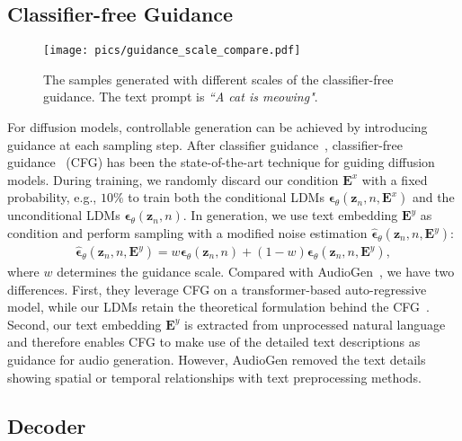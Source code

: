 \subsection{Classifier-free Guidance}
\label{CFG}

\begin{figure}[htbp]
    \centering
    \texttt{[image: pics/guidance\_scale\_compare.pdf]}
    \caption{The samples generated with different scales of the classifier-free guidance. The text prompt is \textit{``A cat is meowing"}.}
    \label{fig:my_label}
\end{figure}

For diffusion models, controllable generation can be achieved by introducing guidance at each sampling step. After classifier guidance~\cite{SGM,ImprovedDDPM}, classifier-free guidance~\cite{CFG,Glide} (CFG) has been the state-of-the-art technique for guiding diffusion models. During training, we randomly discard our condition $\boldsymbol{E}^{x}$ with a fixed probability, e.g., $10\%$ to train both the conditional LDMs $\boldsymbol{\epsilon}_{\theta}(\boldsymbol{z}_{n},n,\boldsymbol{E}^{x})$ and the unconditional LDMs $\boldsymbol{\epsilon}_{\theta}(\boldsymbol{z}_{n},n)$. In generation, we use text embedding $\boldsymbol{E}^{y}$ as condition and perform sampling with a modified noise estimation $\hat{\boldsymbol{\epsilon}}_{\theta}(\boldsymbol{z}_{n},n,\boldsymbol{E}^{y})$:
\begin{align}
\label{mixup}
\hat{\boldsymbol{\epsilon}}_{\theta}(\boldsymbol{z}_{n},n,\boldsymbol{E}^{y}) = w\boldsymbol{\epsilon}_{\theta}(\boldsymbol{z}_{n},n)+(1-w)\boldsymbol{\epsilon}_{\theta}(\boldsymbol{z}_{n},n,\boldsymbol{E}^{y}),
\end{align}
where $w$ determines the guidance scale.
Compared with AudioGen~\cite{kreuk2022audiogen}, we have two differences. First, they leverage CFG on a transformer-based auto-regressive model, while our LDMs retain the theoretical formulation behind the CFG~\cite{CFG}. Second, our text embedding $\boldsymbol{E}^{y}$ is extracted from unprocessed natural language and therefore enables CFG to make use of the detailed text descriptions as guidance for audio generation. However, AudioGen removed the text details showing spatial or temporal relationships with text preprocessing methods. 

\subsection{Decoder}
\label{Decoder}

